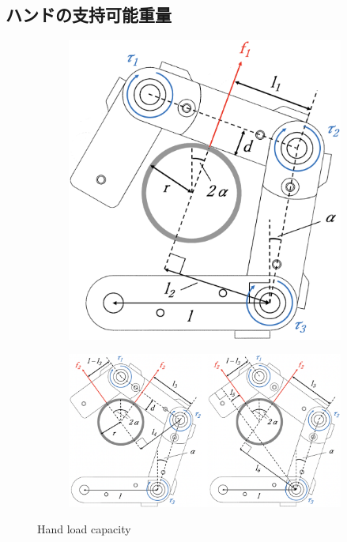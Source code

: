 \documentclass{jarticle}
\begin{document}
\subsection{ハンドの支持可能重量}
\vspace{-2mm}
\begin{figure}[h]
  \centering
  \begin{subfigure}{0.3\columnwidth}
    \includegraphics[width=\textwidth]{figs/weight1.eps}
    \caption{}
    \label{fig:weight1}
  \end{subfigure}
  \begin{subfigure}{0.6\columnwidth}
    \includegraphics[width=\textwidth]{figs/weight2.eps}
    \caption{}
    \label{fig:weight2}
  \end{subfigure}
  \vspace{2mm}
  \caption{Hand load capacity}
  \vspace{-2mm}
\end{figure}
\end{document}
